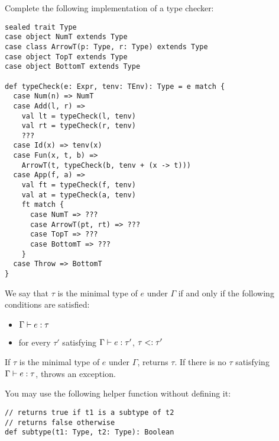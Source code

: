 \begin{exercise}

Complete the following implementation of a \Lang type checker:

\begin{verbatim}
sealed trait Type
case object NumT extends Type
case class ArrowT(p: Type, r: Type) extends Type
case object TopT extends Type
case object BottomT extends Type

def typeCheck(e: Expr, tenv: TEnv): Type = e match {
  case Num(n) => NumT
  case Add(l, r) =>
    val lt = typeCheck(l, tenv)
    val rt = typeCheck(r, tenv)
    ???
  case Id(x) => tenv(x)
  case Fun(x, t, b) =>
    ArrowT(t, typeCheck(b, tenv + (x -> t)))
  case App(f, a) =>
    val ft = typeCheck(f, tenv)
    val at = typeCheck(a, tenv)
    ft match {
      case NumT => ???
      case ArrowT(pt, rt) => ???
      case TopT => ???
      case BottomT => ???
    }
  case Throw => BottomT
}
\end{verbatim}

We say that $\tau$ is the minimal type of $e$ under $\Gamma$ if and only if
the following conditions are satisfied:

\begin{itemize}
  \item $\Gamma\vdash e:\tau$
  \item for every $\tau'$ satisfying $\Gamma\vdash e:\tau'$, $\tau<:\tau'$
\end{itemize}

If $\tau$ is the minimal type of $e$ under $\Gamma$,  returns $\tau$. If there is no $\tau$ satisfying $\Gamma\vdash e:\tau$,
 throws an exception.

You may use the following helper function without defining it:

\begin{verbatim}
// returns true if t1 is a subtype of t2
// returns false otherwise
def subtype(t1: Type, t2: Type): Boolean
\end{verbatim}

\end{exercise}

